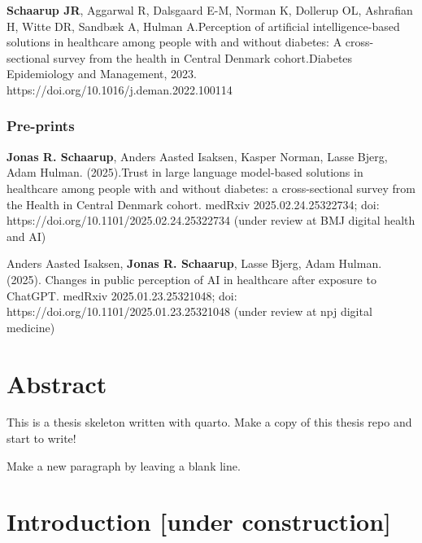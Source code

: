 \documentclass[
  a4paper,
  headsepline=true,
  open=any]{scrbook}
\begin{document}
\textbf{Schaarup JR}, Aggarwal R, Dalsgaard E-M, Norman K, Dollerup OL,
Ashrafian H, Witte DR, Sandbæk A, Hulman A.Perception of artificial
intelligence-based solutions in healthcare among people with and without
diabetes: A cross-sectional survey from the health in Central Denmark
cohort.Diabetes Epidemiology and Management, 2023.
https://doi.org/10.1016/j.deman.2022.100114

\hypertarget{pre-prints}{%
\subsection*{Pre-prints}\label{pre-prints}}

\textbf{Jonas R. Schaarup}, Anders Aasted Isaksen, Kasper Norman, Lasse
Bjerg, Adam Hulman. (2025).Trust in large language model-based solutions
in healthcare among people with and without diabetes: a cross-sectional
survey from the Health in Central Denmark cohort. medRxiv
2025.02.24.25322734; doi: https://doi.org/10.1101/2025.02.24.25322734
(under review at BMJ digital health and AI)

Anders Aasted Isaksen, \textbf{Jonas R. Schaarup}, Lasse Bjerg, Adam
Hulman. (2025). Changes in public perception of AI in healthcare after
exposure to ChatGPT. medRxiv 2025.01.23.25321048; doi:
https://doi.org/10.1101/2025.01.23.25321048 (under review at npj digital
medicine)

\newpage

{\let\clearpage\relax \tableofcontents} 

\listoffigures

\listoftables


\hypertarget{abstract}{%
\chapter*{Abstract}\label{abstract}}


This is a thesis skeleton written with quarto. Make a copy of this
thesis repo and start to write!

Make a new paragraph by leaving a blank line.

\newpage
\tableofcontents


\hypertarget{introduction-under-construction}{%
\chapter{Introduction {[}under
construction{]}}\label{introduction-under-construction}}
\end{document}
